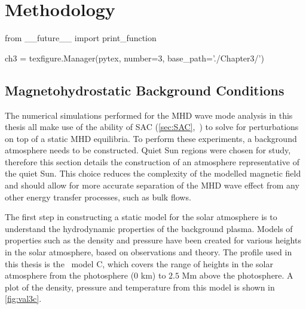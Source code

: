 \chapter{Methodology}\label{ch:methodology}  %

\begin{pycode}[chapter3]
from __future__ import print_function

ch3 = texfigure.Manager(pytex, number=3, base_path='./Chapter3/')
\end{pycode}

\section{Magnetohydrostatic Background Conditions}\label{sec:mhsbackground}

The numerical simulations performed for the MHD wave mode analysis in this thesis all make use of the ability of SAC (\cref{sec:SAC},~\citealt{shelyag2008}) to solve for perturbations on top of a static MHD equilibria.
To perform these experiments, a background atmosphere needs to be constructed.
Quiet Sun regions were chosen for study, therefore this section details the construction of an atmosphere representative of the quiet Sun.
This choice reduces the complexity of the modelled magnetic field and should allow for more accurate separation of the MHD wave effect from any other energy transfer processes, such as bulk flows.

The first step in constructing a static model for the solar atmosphere is to understand the hydrodynamic properties of the background plasma.
Models of properties such as the density and pressure have been created for various heights in the solar atmosphere, based on observations and theory.
The profile used in this thesis is the~\cite{vernazza1981} model C, which covers the range of heights in the solar atmosphere from the photosphere ($0$ km) to $2.5$ Mm above the photosphere.
A plot of the density, pressure and temperature from this model is shown in \cref{fig:val3c}.

